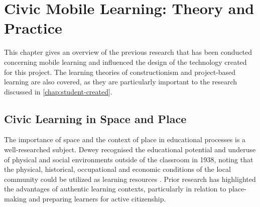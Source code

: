 \chapter{Civic Mobile Learning: Theory and Practice}
\label{chap:MobileLearning}

This chapter gives an overview of the previous research that has been conducted concerning mobile learning and influenced the design of the technology created for this project. The learning theories of constructionism and project-based learning are also covered, as they are particularly important to the research discussed in \autoref{chap:student-created}.

\section{Civic Learning in Space and Place} 

The importance of space and the context of place in educational processes is a well-researched subject. Dewey recognised the educational potential and underuse of physical and social environments outside of the classroom in 1938, noting that the physical, historical, occupational and economic conditions of the local community could be utilized as learning resources \citep{Dewey1938}. Prior research has highlighted the advantages of authentic learning contexts, particularly in relation to place-making and preparing learners for active citizenship.

